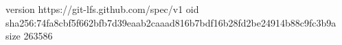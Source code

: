 version https://git-lfs.github.com/spec/v1
oid sha256:74fa8cbf5f662bfb7d39eaab2caaad816b7bdf16b28fd2be24914b88c9fc3b9a
size 263586
